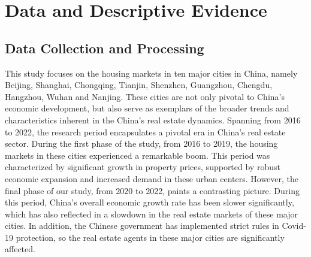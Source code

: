 \documentclass[11pt]{article}
\begin{document}
\section{Data and Descriptive Evidence \label{sec:data}}

\subsection{Data Collection and Processing} \label{subsec:data_collection}

This study focuses on the housing markets in ten major cities in China, namely Beijing, Shanghai, Chongqing, Tianjin, Shenzhen, Guangzhou, Chengdu, Hangzhou, Wuhan and Nanjing. These cities are not only pivotal to China's economic development, but also serve as exemplars of the broader trends and characteristics inherent in the China's real estate dynamics. Spanning from 2016 to 2022, the research period encapsulates a pivotal era in China's real estate sector. During the first phase of the study, from 2016 to 2019, the housing markets in these cities experienced a remarkable boom. This period was characterized by significant growth in property prices, supported by robust economic expansion and increased demand in these urban centers. However, the final phase of our study, from 2020 to 2022, paints a contrasting picture. During this period, China's overall economic growth rate has been slower significantly, which has also reflected in a slowdown in the real estate markets of these major cities. In addition, the Chinese government has implemented strict rules in Covid-19 protection, so the real estate agents in these major cities are significantly affected.
\end{document}
